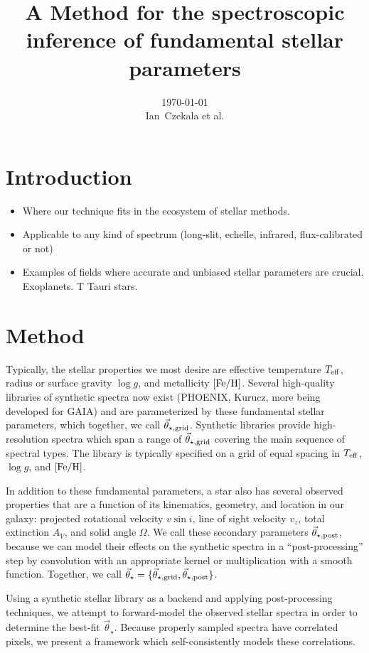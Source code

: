 \documentclass[iop,floatfix]{emulateapj}
\newcommand{\vt}{\vec{\theta}}
\newcommand{\vg}{\vt_{\star, {\rm grid}}}
\newcommand{\vpp}{\vt_{\star, {\rm post}}}
\newcommand{\vstar}{\vt_{\star}}
\newcommand{\Z}{[{\rm Fe}/{\rm H}]}
\begin{document}
\title{A Method for the spectroscopic inference of fundamental stellar parameters}
\author{\today{}\\
\medskip
Ian~Czekala et al.
}


\section{Introduction}
\begin{itemize}
  \item Where our technique fits in the ecosystem of stellar methods.
  \item Applicable to any kind of spectrum (long-slit, echelle, infrared, flux-calibrated or not)
  \item Examples of fields where accurate and unbiased stellar parameters are crucial. Exoplanets. T Tauri stars.
\end{itemize}

\section{Method}
Typically, the stellar properties we most desire are effective temperature $T_{\rm eff}$, radius or surface gravity $\log g$, and metallicity $\Z$. Several high-quality libraries of synthetic spectra now exist (PHOENIX, Kurucz, more being developed for GAIA) and are parameterized by these fundamental stellar parameters, which together, we call $\vg$. Synthetic libraries provide high-resolution spectra which span a range of $\vg$ covering the main sequence of spectral types. The library is typically specified on a grid of equal spacing in $T_{\rm eff}$, $\log g$, and $\Z$.

In addition to these fundamental parameters, a star also has several observed properties that are a function of its kinematics, geometry, and location in our galaxy: projected rotational velocity $v \sin i$, line of sight velocity $v_z$, total extinction $A_V$, and solid angle $\Omega$. We call these secondary parameters $\vpp$, because we can model their effects on the synthetic spectra in a ``post-processing'' step by convolution with an appropriate kernel or multiplication with a smooth function. Together, we call $\vstar = \{\vg, \vpp\}$.

Using a synthetic stellar library as a backend and applying post-processing techniques, we attempt to forward-model the observed stellar spectra in order to determine the best-fit $\vstar$. Because properly sampled spectra have correlated pixels, we present a framework which self-consistently models these correlations. 
\end{document}
